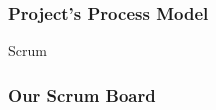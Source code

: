 \begin{frame}[t]
    \frametitle{Project's Process Model}
    
   Scrum

\end{frame}




\begin{frame}[t]
	\frametitle{Our Scrum Board}
    \begin{figure}
	    \begin{center}
	    \end{center}
	\end{figure}
\end{frame}
